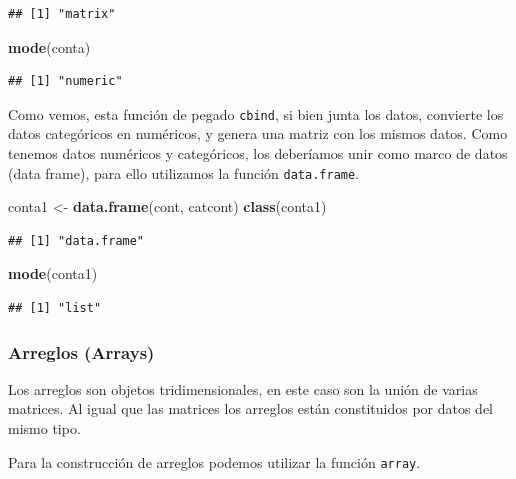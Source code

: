 \documentclass[]{article}
\newenvironment{Shaded}{\begin{snugshade}}{\end{snugshade}}
\newcommand{\KeywordTok}[1]{\textcolor[rgb]{0.13,0.29,0.53}{\textbf{{#1}}}}
\newcommand{\StringTok}[1]{\textcolor[rgb]{0.31,0.60,0.02}{{#1}}}
\newcommand{\NormalTok}[1]{{#1}}
\begin{document}
\begin{verbatim}
## [1] "matrix"
\end{verbatim}

\begin{Shaded}
\begin{Highlighting}[]
\KeywordTok{mode}\NormalTok{(conta)}
\end{Highlighting}
\end{Shaded}

\begin{verbatim}
## [1] "numeric"
\end{verbatim}

Como vemos, esta función de pegado \texttt{cbind}, si bien junta los
datos, convierte los datos categóricos en numéricos, y genera una matriz
con los mismos datos. Como tenemos datos numéricos y categóricos, los
deberíamos unir como marco de datos (data frame), para ello utilizamos
la función \texttt{data.frame}.

\begin{Shaded}
\begin{Highlighting}[]
\NormalTok{conta1 <-}\StringTok{ }\KeywordTok{data.frame}\NormalTok{(cont, catcont)}
\KeywordTok{class}\NormalTok{(conta1)}
\end{Highlighting}
\end{Shaded}

\begin{verbatim}
## [1] "data.frame"
\end{verbatim}

\begin{Shaded}
\begin{Highlighting}[]
\KeywordTok{mode}\NormalTok{(conta1)}
\end{Highlighting}
\end{Shaded}

\begin{verbatim}
## [1] "list"
\end{verbatim}

\subsubsection{Arreglos (Arrays)}\label{arreglos-arrays}

Los arreglos son objetos tridimensionales, en este caso son la unión de
varias matrices. Al igual que las matrices los arreglos están
constituidos por datos del mismo tipo.

Para la construcción de arreglos podemos utilizar la función
\texttt{array}.
\end{document}
